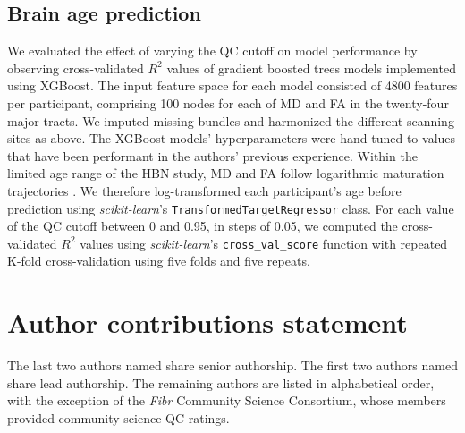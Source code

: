 \documentclass[9pt,lineno]{elife}
\begin{document}
\subsection{Brain age prediction}

We evaluated the effect of varying the QC cutoff on model performance by
observing cross-validated $R^2$ values of gradient boosted trees models
implemented using XGBoost. The input feature space for each model consisted of
\num{4800} features per participant, comprising 100 nodes for each of MD and FA in
the twenty-four major tracts. We imputed missing bundles and harmonized the
different scanning sites as above. The XGBoost models' hyperparameters were
hand-tuned to values that have been performant in the authors' previous
experience. Within the limited age range of the HBN study, MD and FA follow logarithmic maturation trajectories \citep{yeatman2014lifespan}. We therefore log-transformed each participant's age before prediction using
\emph{scikit-learn}'s \texttt{TransformedTargetRegressor} class. For each value
of the QC cutoff between 0 and 0.95, in steps of 0.05, we computed the
cross-validated $R^2$ values using \emph{scikit-learn}'s
\texttt{cross\_val\_score} function with repeated K-fold cross-validation using
five folds and five repeats.

\section{Author contributions statement}

The last two authors named share senior authorship. The first two authors named
share lead authorship. The remaining authors are listed in alphabetical order,
with the exception of the \emph{Fibr} Community Science Consortium, whose members
provided community science QC ratings.

\end{document}
